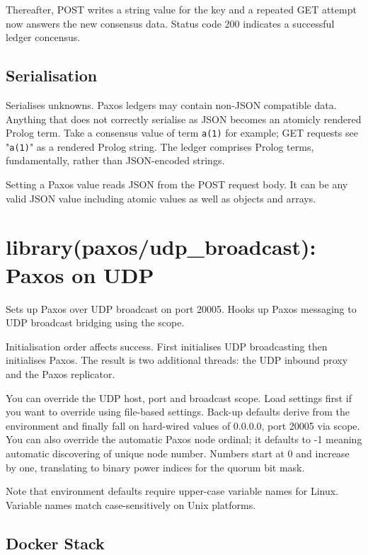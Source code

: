 Thereafter, POST writes a string value for the key and a repeated GET
attempt now answers the new consensus data. Status code 200 indicates a
successful ledger concensus.

\section{Serialisation}

Serialises unknowns. Paxos ledgers may contain non-JSON compatible data.
Anything that does not correctly serialise as JSON becomes an atomicly
rendered Prolog term. Take a consensus value of term \verb$a(1)$ for example;
GET requests see "\verb$a(1)$" as a rendered Prolog string. The ledger
comprises Prolog terms, fundamentally, rather than JSON-encoded strings.

Setting a Paxos value reads JSON from the POST request body. It can be
any valid JSON value including atomic values as well as objects and
arrays.\vspace{0.7cm}\chapter{library(paxos/udp_broadcast): Paxos on UDP}\label{sec:udpbroadcast}

Sets up Paxos over UDP broadcast on port 20005. Hooks up Paxos messaging
to UDP broadcast bridging using the  scope.

Initialisation order affects success. First initialises UDP
broadcasting then initialises Paxos. The result is two additional
threads: the UDP inbound proxy and the Paxos replicator.

You can override the UDP host, port and broadcast scope. Load settings
first if you want to override using file-based settings. Back-up
defaults derive from the environment and finally fall on hard-wired
values of 0.0.0.0, port 20005 via  scope. You can also override
the automatic Paxos node ordinal; it defaults to -1 meaning automatic
discovering of unique node number. Numbers start at 0 and increase by
one, translating to binary power indices for the quorum bit mask.

Note that environment defaults require upper-case variable names for
Linux. Variable names match case-sensitively on Unix platforms.

\section{Docker Stack}


